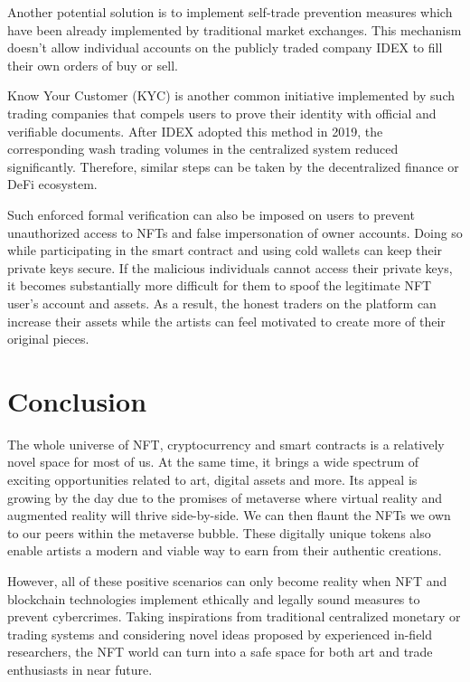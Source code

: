 \documentclass{article}
\begin{document}
Another potential solution is to implement self-trade prevention measures which have been already implemented by traditional market exchanges. \cite{victor2021detecting} This mechanism doesn’t allow individual accounts on the publicly traded company IDEX to fill their own orders of buy or sell. 

Know Your Customer (KYC) is another common initiative implemented by such trading companies that compels users to prove their identity with official and verifiable documents. After IDEX adopted this method in 2019, the corresponding wash trading volumes in the centralized system reduced significantly. \cite{victor2021detecting}
Therefore, similar steps can be taken by the decentralized finance or DeFi ecosystem. 

Such enforced formal verification can also be imposed on users to prevent unauthorized access to NFTs and false impersonation of owner accounts. Doing so while participating in the smart contract and using cold wallets can keep their private keys secure. If the malicious individuals cannot access their private keys, it becomes substantially more difficult for them to spoof the legitimate NFT user's account and assets. As a result, the honest traders  on the platform can increase their assets while the artists can feel motivated to create more of their original pieces.

\section{Conclusion}
The whole universe of NFT, cryptocurrency and smart contracts is a relatively novel space for most of us. At the same time, it brings a wide spectrum of exciting opportunities related to art, digital assets and more. Its appeal is growing by the day due to the promises of metaverse where virtual reality and augmented reality will thrive side-by-side. We can then flaunt the NFTs we own to our peers within the metaverse bubble. These digitally unique tokens also enable artists a modern and viable way to earn from their authentic creations.

However, all of these positive scenarios can only become reality when NFT and blockchain technologies implement ethically and legally sound measures to prevent cybercrimes. Taking inspirations from traditional centralized monetary or trading systems and considering novel ideas proposed by experienced in-field researchers, the NFT world can turn into a safe space for both art and trade enthusiasts in near future.


\end{document}
